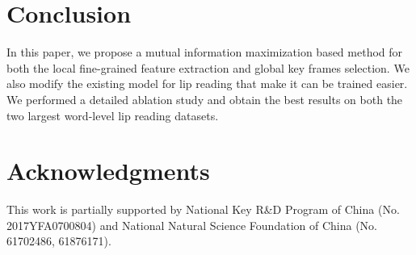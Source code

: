 \documentclass[a4paper, 10pt, conference]{ieeeconf}      \usepackage{FG2020}
\begin{document}
 \section{Conclusion}
 In this paper, we propose a mutual information maximization based method for both the local fine-grained feature extraction and global key frames selection. We also modify the existing model for lip reading that make it can be trained easier. We performed a detailed ablation study and obtain the best results on both the two largest word-level lip reading datasets.\section{Acknowledgments}
This work is partially supported by National Key R\&D Program of China (No. 2017YFA0700804) and National Natural Science Foundation of China (No. 61702486, 61876171).  




{}

\end{document}
